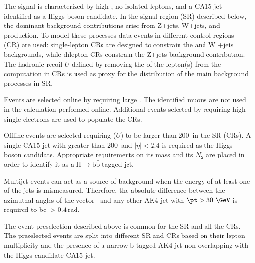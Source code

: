 The signal is characterized by high \MET, no isolated leptons, and a CA15 jet identified as a Higgs boson candidate. In the signal region (SR) described
below, the dominant background contributions arise from Z+jets, W+jets, and \ttbar production. To model these processes data events in different control regions (CR) are used: single-lepton CRs are designed to constrain the \ttbar and W +jets backgrounds, while dilepton CRs constrain the Z+jets background contribution. The hadronic recoil $U$ defined by removing the \pt of the lepton(s) from the \MET computation in CRs is used as proxy for the \MET distribution of the main background processes in SR. 

Events are selected online by requiring large \MET.
The identified muons are not used in the \MET calculation performed online.
Additional events selected by requiring high-\pt single electrons are used to populate the CRs. 

Offline events are selected requiring \MET ($U$) to be larger than 200~\GeV in the SR (CRs). A single CA15 jet with \pt greater than 200~\GeV and $|\eta|<2.4$ is required as the Higgs boson candidate. Appropriate requirements on its mass and its $N_2$ are placed in order to identify it as a $\mathrm{H}\to\mathrm{b}\bar{\mathrm{b}}$-tagged jet.
 
Multijet events can act as a source of background when the energy of at least one of the jets is mismeasured. 
Therefore, the absolute difference between the azimuthal angles of the vector \ptvecmiss\ and any other AK4 jet with $\pt>30~\GeV$ 
is required to be $>0.4$\,rad. 

The event preselection described above is common for the SR and all the CRs. The preselected events are split into different SR and CRs based on their lepton multiplicity and the presence of a narrow b tagged AK4 jet non overlapping with the Higgs candidate CA15 jet.

